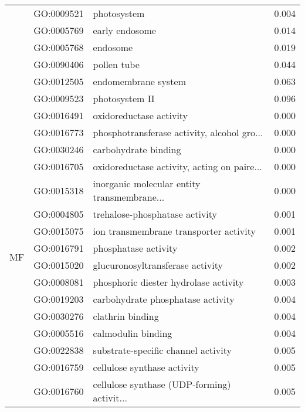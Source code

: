 \begin{longtable}{lllr}
   & GO:0009521 &                                  photosystem &         0.004 \\
   & GO:0005769 &                               early endosome &         0.014 \\
   & GO:0005768 &                                     endosome &         0.019 \\
   & GO:0090406 &                                  pollen tube &         0.044 \\
   & GO:0012505 &                          endomembrane system &         0.063 \\
   & GO:0009523 &                               photosystem II &         0.096 \\
\cline{1-4}
\multirow{56}{*}{MF} & GO:0016491 &                      oxidoreductase activity &         0.000 \\
   & GO:0016773 &  phosphotransferase activity, alcohol gro... &         0.000 \\
   & GO:0030246 &                         carbohydrate binding &         0.000 \\
   & GO:0016705 &  oxidoreductase activity, acting on paire... &         0.000 \\
   & GO:0015318 &  inorganic molecular entity transmembrane... &         0.000 \\
   & GO:0004805 &               trehalose-phosphatase activity &         0.001 \\
   & GO:0015075 &       ion transmembrane transporter activity &         0.001 \\
   & GO:0016791 &                         phosphatase activity &         0.002 \\
   & GO:0015020 &             glucuronosyltransferase activity &         0.002 \\
   & GO:0008081 &        phosphoric diester hydrolase activity &         0.003 \\
   & GO:0019203 &            carbohydrate phosphatase activity &         0.004 \\
   & GO:0030276 &                             clathrin binding &         0.004 \\
   & GO:0005516 &                           calmodulin binding &         0.004 \\
   & GO:0022838 &          substrate-specific channel activity &         0.005 \\
   & GO:0016759 &                  cellulose synthase activity &         0.005 \\
   & GO:0016760 &  cellulose synthase (UDP-forming) activit... &         0.005 \\

\end{longtable}
